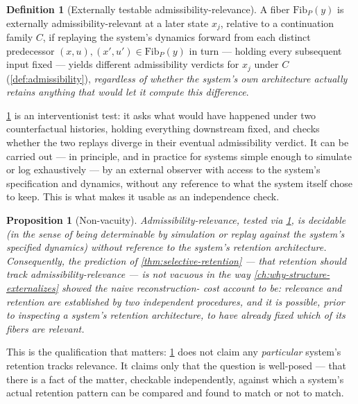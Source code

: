 \documentclass[11pt]{book}
\theoremstyle{plain}
\newtheorem{proposition}[theorem]{Proposition}
\theoremstyle{definition}
\newtheorem{definition}[theorem]{Definition}
\theoremstyle{remark}
\begin{document}
\begin{definition}[Externally testable admissibility-relevance]
\label{def:external-relevance}
A fiber $\mathrm{Fib}_P(y)$ is externally admissibility-relevant at a
later state $x_j$, relative to a continuation family $C$, if replaying
the system's dynamics forward from each distinct predecessor $(x,u),
(x',u') \in \mathrm{Fib}_P(y)$ in turn --- holding every subsequent
input fixed --- yields different admissibility verdicts for $x_j$
under $C$ (\cref{def:admissibility}), \emph{regardless of whether the
system's own architecture actually retains anything that would let it
compute this difference}.
\end{definition}

\cref{def:external-relevance} is an interventionist test: it asks what
would have happened under two counterfactual histories, holding
everything downstream fixed, and checks whether the two replays
diverge in their eventual admissibility verdict. It can be carried
out --- in principle, and in practice for systems simple enough to
simulate or log exhaustively --- by an external observer with access
to the system's specification and dynamics, without any reference to
what the system itself chose to keep. This is what makes it usable as
an independence check.

\begin{proposition}[Non-vacuity]
\label{prop:non-vacuity}
Admissibility-relevance, tested via \cref{def:external-relevance}, is
decidable (in the sense of being determinable by simulation or replay
against the system's specified dynamics) without reference to the
system's retention architecture. Consequently, the prediction of
\cref{thm:selective-retention} --- that retention should track
admissibility-relevance --- is not vacuous in the way
\cref{ch:why-structure-externalizes} showed the naive reconstruction-
cost account to be: relevance and retention are established by two
independent procedures, and it is possible, prior to inspecting a
system's retention architecture, to have already fixed which of its
fibers are relevant.
\end{proposition}

This is the qualification that matters: \cref{prop:non-vacuity} does
not claim any \emph{particular} system's retention tracks relevance.
It claims only that the question is well-posed --- that there is a
fact of the matter, checkable independently, against which a system's
actual retention pattern can be compared and found to match or not to
match.
\end{document}
